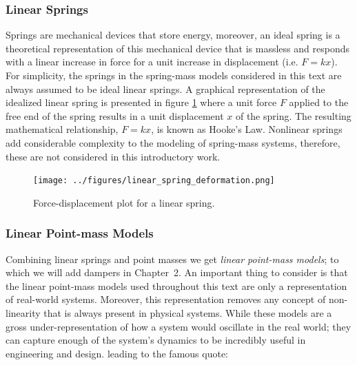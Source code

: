 \documentclass[12pt,letter]{article}
\begin{document}
\pagebreak
					
		\subsubsection{Linear Springs}
	
            Springs are mechanical devices that store energy, moreover, an ideal spring is a theoretical representation of this mechanical device that is massless and responds with a linear increase in force for a unit increase in displacement (i.e. $F=kx$). For simplicity, the springs in the spring-mass models considered in this text are always assumed to be ideal linear springs. A graphical representation of the idealized linear spring is presented in figure \ref{fig:linear_spring_deformation} where a unit force $F$ applied to the free end of the spring results in a unit displacement $x$ of the spring.  The resulting mathematical relationship,  $F=kx$, is known as Hooke's Law. Nonlinear springs add considerable complexity to the modeling of spring-mass systems, therefore, these are not considered in this introductory work. 
			
			\begin{figure}[H]
				\centering
				\texttt{[image: ../figures/linear\_spring\_deformation.png]}
				\caption{Force-displacement plot for a linear spring.}
				\label{fig:linear_spring_deformation}
			\end{figure}					

		\subsubsection{Linear Point-mass Models}
		
			Combining linear springs and point masses we get \emph{linear point-mass models}; to which we will add dampers in Chapter~2. An important thing to consider is that the linear point-mass models used throughout this text are only a representation of real-world systems. Moreover, this representation removes any concept of non-linearity that is always present in physical systems. While these models are a gross under-representation of how a system would oscillate in the real world; they can capture enough of the system's dynamics to be incredibly useful in engineering and design. leading to the famous quote:   
\end{document}

